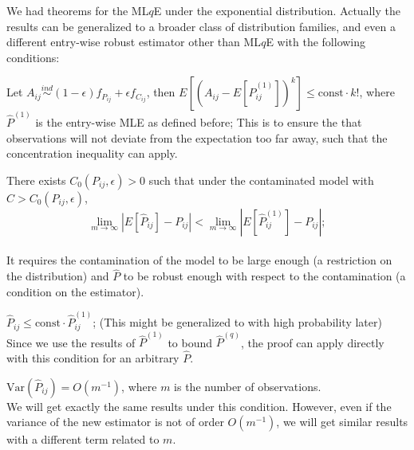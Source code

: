 \documentclass[simplex.tex]{subfiles}
\begin{document}
We had theorems for the ML$q$E under the exponential distribution. Actually the results can be generalized to a broader class of distribution families, and even a different entry-wise robust estimator other than ML$q$E with the following conditions:
\begin{compactenum}
\item Let $A_{ij} \stackrel{ind}{\sim} (1-\epsilon) f_{P_{ij}} + \epsilon f_{C_{ij}}$, then $E[(A_{ij} - E[\hat{P}_{ij}^{(1)}])^k] \le \mathrm{const} \cdot k!$, where $\hat{P}^{(1)}$ is the entry-wise MLE as defined before;
This is to ensure the that observations will not deviate from the expectation too far away, such that the concentration inequality can apply.
\item There exists $C_0(P_{ij}, \epsilon) > 0$ such that under the contaminated model with $C > C_0(P_{ij}, \epsilon)$,
\[
	\lim_{m \to \infty} \left| E[\hat{P}_{ij}] - P_{ij} \right| < 
    \lim_{m \to \infty} \left| E[\hat{P}^{(1)}_{ij}] - P_{ij} \right|;
\]\\
It requires the contamination of the model to be large enough (a restriction on the distribution) and $\hat{P}$ to be robust enough with respect to the contamination (a condition on the estimator).
\item $\hat{P}_{ij} \le \mathrm{const} \cdot \hat{P}_{ij}^{(1)}$; (This might be generalized to with high probability later)\\
Since we use the results of $\hat{P}^{(1)}$ to bound $\hat{P}^{(q)}$, the proof can apply directly with this condition for an arbitrary $\hat{P}$.
\item $\mathrm{Var}(\hat{P}_{ij}) = O(m^{-1})$, where $m$ is the number of observations.\\
We will get exactly the same results under this condition. However, even if the variance of the new estimator is not of order $O(m^{-1})$, we will get similar results with a different term related to $m$.
\end{compactenum}

\clearpage
\end{document}
